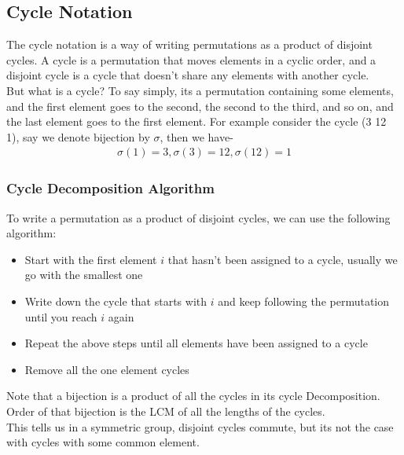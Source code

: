 \documentclass[12pt,a4paper,oneside]{report}
\theoremstyle{definition}
\begin{document}
\subsection{Cycle Notation}
The cycle notation is a way of writing permutations as a product of disjoint cycles. A cycle is a permutation that moves elements in a cyclic order, and a disjoint cycle is a cycle that doesn't share any elements with another cycle.
\\But what is a cycle? To say simply, its a permutation containing some elements, and the first element goes to the second, the second to the third, and so on, and the last element goes to the first element. For example consider the cycle (3 12 1), say we denote bijection by $\sigma$, then we have-
\begin{align*}
  \sigma(1)=3, \sigma(3)=12, \sigma(12)=1
\end{align*}
\subsubsection{Cycle Decomposition Algorithm}
To write a permutation as a product of disjoint cycles, we can use the following algorithm:
\begin{itemize}
  \item Start with the first element $i$ that hasn't been assigned to a cycle, usually we go with the smallest one
  \item Write down the cycle that starts with $i$ and keep following the permutation until you reach $i$ again
  \item Repeat the above steps until all elements have been assigned to a cycle
  \item Remove all the one element cycles
\end{itemize}
Note that a bijection is a product of all the cycles in its cycle Decomposition. Order of that bijection is the LCM of all the lengths of the cycles.
\\This tells us in a symmetric group, disjoint cycles commute, but its not the case with cycles with some common element.
\end{document}
